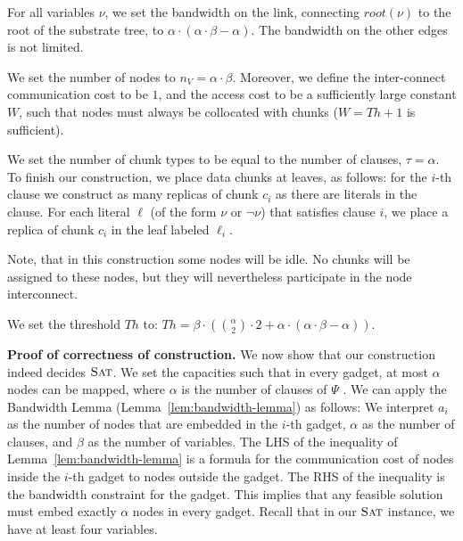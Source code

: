 \documentclass[conference,10pt]{IEEEtran}
\newcommand{\maciek}[1]{\textcolor{brown}{maciek: #1}}
\newcommand{\variab}{\nu}
\newcommand{\clauses}{\alpha}
\newcommand{\variables}{\beta}
\newcommand{\achunk}{\ensuremath{c}}
\newcommand{\Vms}{\ensuremath{n_V}}
\newcommand{\SAT}{\textsc{Sat}}
\newcommand{\Formula}{\ensuremath{\Psi}}
\newcommand{\Thr}{\ensuremath{Th}}
\begin{document}
For all variables $\nu$, we set the bandwidth
on the link, connecting $root(\nu)$ to the root of
the substrate tree, to $\clauses\cdot(\clauses\cdot\variables-\clauses)$. The bandwidth on the other
edges is not limited.


We set the number of nodes to $\Vms = \clauses \cdot \variables$.
Moreover, we define the inter-connect communication cost to be $1$,
and the access cost to be a sufficiently large constant $W$,
such that nodes must always be collocated with chunks ($W = \Thr + 1$ is
sufficient).


We set the number of chunk types to be equal to the number of clauses, $\tau =
\clauses$. To finish our construction, we place data chunks at
leaves, as follows: for the $i$-th clause we
construct as many replicas of chunk $\achunk_i$ as there are literals in the
clause. For each literal $\ell$ (of the form $\variab$ or $\neg \variab$) that satisfies clause $i$,
 we place
a replica of chunk $\achunk_i$ in the leaf labeled $\ell_i$.

Note, that in this construction some nodes will be idle. No chunks will be 
assigned to these nodes, but they will nevertheless participate in the node 
interconnect.

We set the threshold $\Thr$ to:
$ \Thr = \variables \cdot ({\clauses  \choose 2} \cdot 2 +
\clauses \cdot (\clauses
\cdot \variables - \clauses))$.

\textbf{Proof of correctness of construction.}
We now show that our construction indeed
decides $\SAT$. We set the capacities such that in every gadget,
at most $\clauses$ nodes can be mapped, where $\clauses$
is the number of clauses of $\Formula$
.
We can apply the Bandwidth Lemma (Lemma~\ref{lem:bandwidth-lemma}) as follows:
We interpret $a_i$ as the
number of nodes that are embedded in the $i$-th gadget, $\clauses$
as the number
of clauses, and $\variables$ as the number of variables.
The LHS of the inequality of Lemma~\ref{lem:bandwidth-lemma}
is a formula for the communication cost of nodes inside the $i$-th
gadget to nodes outside the gadget. The RHS of the inequality is the
bandwidth constraint for the gadget. This implies that
any feasible solution must embed exactly $\clauses$ nodes in every gadget.
Recall that in our $\SAT$ instance, we have at least four variables.
\end{document}
